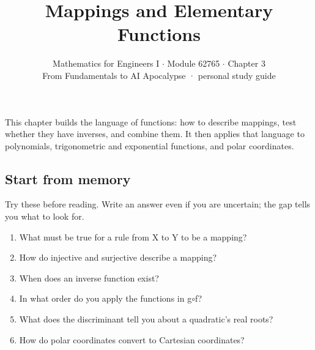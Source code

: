 \documentclass[11pt]{article}
\title{\sffamily\bfseries\color{FAUblue}Mappings and Elementary Functions}
\author{Mathematics for Engineers I \ensuremath{\cdot} Module 62765 \ensuremath{\cdot} Chapter 3\\[2pt]\small From Fundamentals to AI Apocalypse · personal study guide}
\date{}
\begin{document}
\maketitle
\begingroup\footnotesize\setlength{\parskip}{0pt}\tableofcontents\endgroup
\clearpage

{\large This chapter builds the language of functions: how to describe mappings, test whether they have inverses, and combine them. It then applies that language to polynomials, trigonometric and exponential functions, and polar coordinates.}


\begin{keepsection}
\section{Start from memory}

Try these before reading. Write an answer even if you are uncertain; the gap tells you what to look for.

\begin{enumerate}
\item What must be true for a rule from X to Y to be a mapping?
\item How do injective and surjective describe a mapping?
\item When does an inverse function exist?
\item In what order do you apply the functions in g\ensuremath{\circ}f?
\item What does the discriminant tell you about a quadratic’s real roots?
\item How do polar coordinates convert to Cartesian coordinates?
\end{enumerate}

\end{keepsection}
\end{document}
